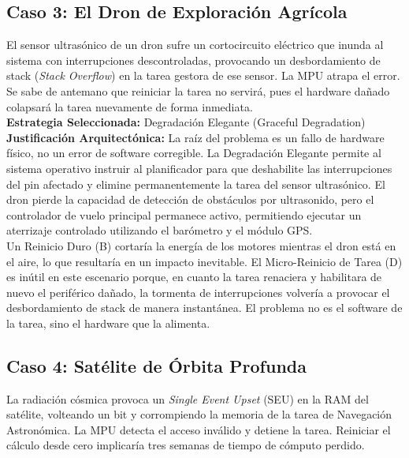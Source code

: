 \documentclass[12pt,letterpaper]{article}
\begin{document}
\subsection*{Caso 3: El Dron de Exploración Agrícola}
El sensor ultrasónico de un dron sufre un cortocircuito eléctrico que inunda al sistema con interrupciones
descontroladas, provocando un desbordamiento de stack (\textit{Stack Overflow}) en la tarea gestora de ese
sensor. La MPU atrapa el error. Se sabe de antemano que reiniciar la tarea no servirá, pues el hardware dañado
colapsará la tarea nuevamente de forma inmediata.\\
 
\textbf{Estrategia Seleccionada:} Degradación Elegante (Graceful Degradation)\\
 
\textbf{Justificación Arquitectónica:} La raíz del problema es un fallo de hardware físico, no un error de
software corregible. La Degradación Elegante permite al sistema operativo instruir al planificador para que
deshabilite las interrupciones del pin afectado y elimine permanentemente la tarea del sensor ultrasónico.
El dron pierde la capacidad de detección de obstáculos por ultrasonido, pero el controlador de vuelo principal
permanece activo, permitiendo ejecutar un aterrizaje controlado utilizando el barómetro y el módulo GPS.\\
 
Un Reinicio Duro (B) cortaría la energía de los motores mientras el dron está en el aire, lo que resultaría en un
impacto inevitable. El Micro-Reinicio de Tarea (D) es inútil en este escenario porque, en cuanto la tarea
renaciera y habilitara de nuevo el periférico dañado, la tormenta de interrupciones volvería a provocar el
desbordamiento de stack de manera instantánea. El problema no es el software de la tarea, sino el hardware que la
alimenta.
 
\subsection*{Caso 4: Satélite de Órbita Profunda}
La radiación cósmica provoca un \textit{Single Event Upset} (SEU) en la RAM del satélite, volteando un bit y
corrompiendo la memoria de la tarea de Navegación Astronómica. La MPU detecta el acceso inválido y detiene la
tarea. Reiniciar el cálculo desde cero implicaría tres semanas de tiempo de cómputo perdido.
 
\end{document}
